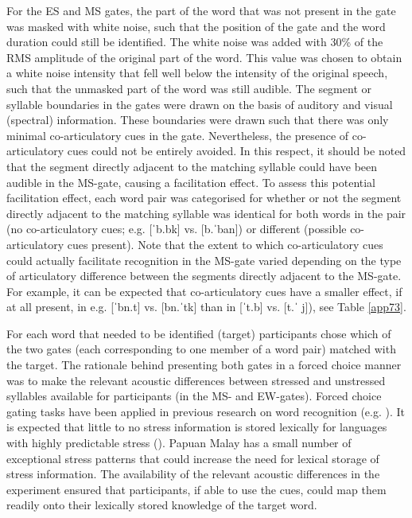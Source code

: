 For the ES and MS gates, the part of the word that was not present in the gate was masked with white noise, such that the position of the gate and the word duration could still be identified. The white noise was added with 30\% of the RMS amplitude of the original part of the word. This value was chosen to obtain a white noise intensity that fell well below the intensity of the original speech, such that the unmasked part of the word was still audible. The segment or syllable boundaries in the gates were drawn on the basis of auditory and visual (spectral) information. These boundaries were drawn such that there was only minimal co-articulatory cues in the gate. Nevertheless, the presence of co-articulatory cues could not be entirely avoided. In this respect, it should be noted that the segment directly adjacent to the matching syllable could have been audible in the MS-gate, causing a facilitation effect. To assess this potential facilitation effect, each word pair was categorised for whether or not the segment directly adjacent to the matching syllable was identical for both words in the pair (no co-articulatory cues; e.g. [ˈb.bk] vs. [b.ˈban]) or different (possible co-articulatory cues present). Note that the extent to which co-articulatory cues could actually facilitate recognition in the MS-gate varied depending on the type of articulatory difference between the segments directly adjacent to the MS-gate. For example, it can be expected that co-articulatory cues have a smaller effect, if at all present, in e.g. [ˈbn.t] vs. [bn.ˈtk] than in [ˈt.b] vs. [t.ˈ j]), see Table \ref{app73}.\par

For each word that needed to be identified (target) participants chose which of the two gates (each corresponding to one member of a word pair) matched with the target. The rationale behind presenting both gates in a forced choice manner was to make the relevant acoustic differences between stressed and unstressed syllables available for participants (in the MS- and EW-gates). Forced choice gating tasks have been applied in previous research on word recognition (e.g. \citealt{davis_leading_2002}). It is expected that little to no stress information is stored lexically for languages with highly predictable stress (\citealt{peperkamp_perception_2010}). Papuan Malay has a small number of exceptional stress patterns that could increase the need for lexical storage of stress information. The availability of the relevant acoustic differences in the experiment ensured that participants, if able to use the cues, could map them readily onto their lexically stored knowledge of the target word.\par

